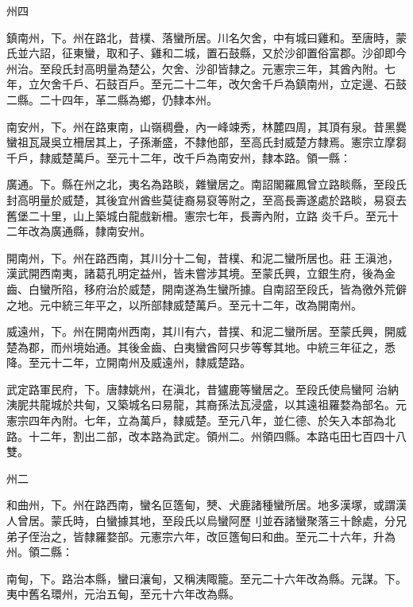 \begin{pinyinscope}
 州四



 鎮南州，下。州在路北，昔樸、落蠻所居。川名欠舍，中有城曰雞和。至唐時，蒙氏並六詔，征東蠻，取和子、雞和二城，置石鼓縣，又於沙卻置俗富郡。沙卻即今州治。至段氏封高明量為楚公，欠舍、沙卻皆隸之。元憲宗三年，其酋內附。七年，立欠舍千戶、石鼓百戶。至元二十二年，改欠舍千戶為鎮南州，立定邊、石鼓二縣。二十四年，革二縣為鄉，仍隸本州。



 南安州，下。州在路東南，山嶺稠疊，內一峰竦秀，林麓四周，其頂有泉。昔黑爨蠻祖瓦晟吳立柵居其上，子孫漸盛，不隸他部，至高氏封威楚方隸焉。憲宗立摩芻千戶，隸威楚萬戶。至元十二年，改千戶為南安州，隸本路。領一縣：



 廣通。下。縣在州之北，夷名為路睒，雜蠻居之。南詔閣羅鳳曾立路睒縣，至段氏封高明量於威楚，其後宜州酋些莫徒裔易裒等附之，至高長壽遂處於路睒，易裒去舊堡二十里，山上築城白龍戲新柵。憲宗七年，長壽內附，立路炎千戶。至元十二年改為廣通縣，隸南安州。



 開南州，下。州在路西南，其川分十二甸，昔樸、和泥二蠻所居也。莊王滇池，漢武開西南夷，諸葛孔明定益州，皆未嘗涉其境。至蒙氏興，立銀生府，後為金齒、白蠻所陷，移府治於威楚，開南遂為生蠻所據。自南詔至段氏，皆為徼外荒僻之地。元中統三年平之，以所部隸威楚萬戶。至元十二年，改為開南州。



 威遠州，下。州在開南州西南，其川有六，昔撲、和泥二蠻所居。至蒙氏興，開威楚為郡，而州境始通。其後金齒、白夷蠻酋阿只步等奪其地。中統三年征之，悉降。至元十二年，立開南州及威遠州，隸威楚路。



 武定路軍民府，下。唐隸姚州，在滇北，昔獹鹿等蠻居之。至段氏使烏蠻阿治納洟胒共龍城於共甸，又築城名曰易龍，其裔孫法瓦浸盛，以其遠祖羅婺為部名。元憲宗四年內附。七年，立為萬戶，隸威楚。至元八年，並仁德、於矢入本部為北路。十二年，割出二部，改本路為武定。領州二。州領四縣。本路屯田七百四十八雙。



 州二



 和曲州，下。州在路西南，蠻名叵簉甸，僰、犬鹿諸種蠻所居。地多漢塚，或謂漢人曾居。蒙氏時，白蠻據其地，至段氏以烏蠻阿歷刂並吞諸蠻聚落三十餘處，分兄弟子侄治之，皆隸羅婺部。元憲宗六年，改叵簉甸曰和曲。至元二十六年，升為州。領二縣：



 南甸，下。路治本縣，蠻曰瀼甸，又稱洟陬籠。至元二十六年改為縣。元謀。下。夷中舊名環州，元治五甸，至元十六年改為縣。




\end{pinyinscope}
